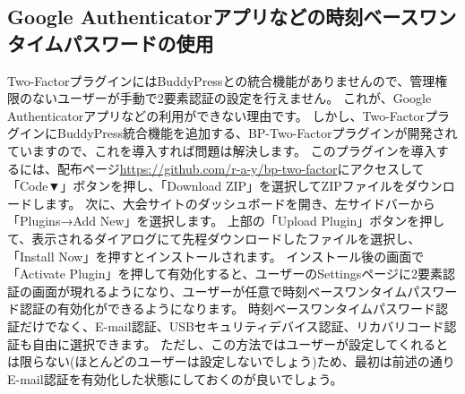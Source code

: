 \documentclass[titlepage,10pt,a4paper,uplatex]{jsbook}
\begin{document}
\subsection{Google Authenticatorアプリなどの時刻ベースワンタイムパスワードの使用}

Two-FactorプラグインにはBuddyPressとの統合機能がありませんので、管理権限のないユーザーが手動で2要素認証の設定を行えません。
これが、Google Authenticatorアプリなどの利用ができない理由です。
しかし、Two-FactorプラグインにBuddyPress統合機能を追加する、BP-Two-Factorプラグインが開発されていますので、これを導入すれば問題は解決します。
このプラグインを導入するには、配布ページ\url{https://github.com/r-a-y/bp-two-factor}にアクセスして「Code▼」ボタンを押し、「Download ZIP」を選択してZIPファイルをダウンロードします。
次に、大会サイトのダッシュボードを開き、左サイドバーから「Plugins→Add New」を選択します。
上部の「Upload Plugin」ボタンを押して、表示されるダイアログにて先程ダウンロードしたファイルを選択し、「Install Now」を押すとインストールされます。
インストール後の画面で「Activate Plugin」を押して有効化すると、ユーザーのSettingsページに2要素認証の画面が現れるようになり、ユーザーが任意で時刻ベースワンタイムパスワード認証の有効化ができるようになります。
時刻ベースワンタイムパスワード認証だけでなく、E-mail認証、USBセキュリティデバイス認証、リカバリコード認証も自由に選択できます。
ただし、この方法ではユーザーが設定してくれるとは限らない(ほとんどのユーザーは設定しないでしょう)ため、最初は前述の通りE-mail認証を有効化した状態にしておくのが良いでしょう。
\end{document}
